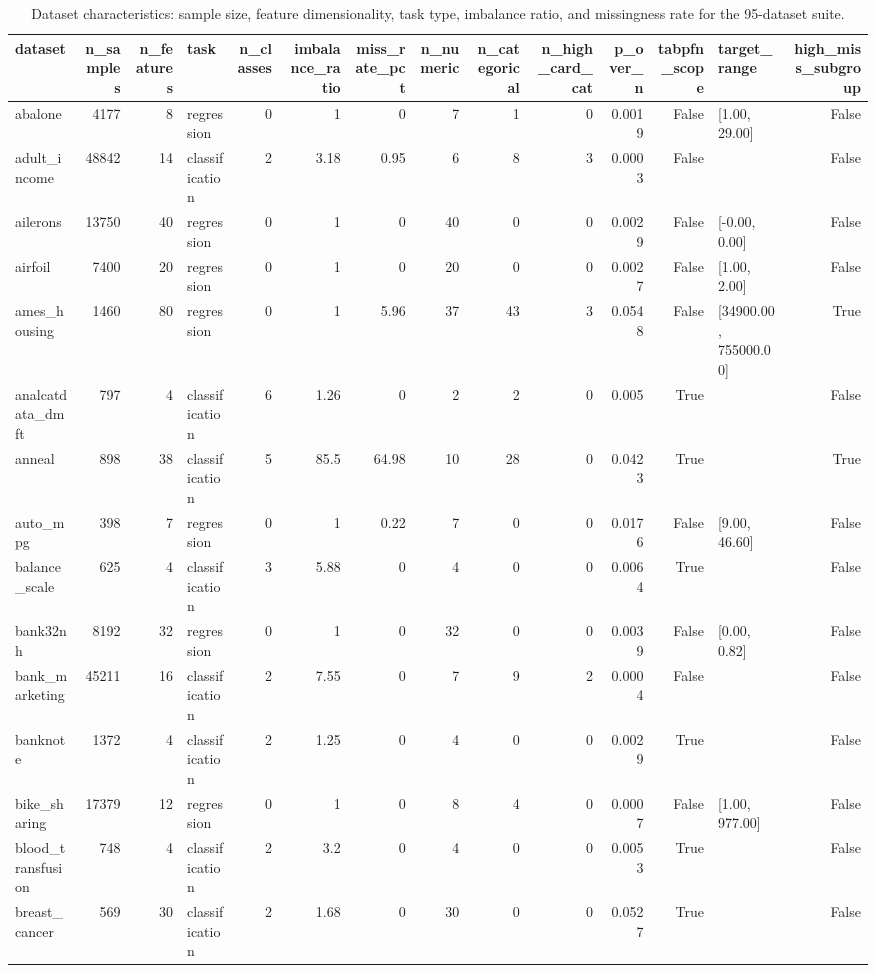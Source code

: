 \begin{table}
\caption{Dataset characteristics: sample size, feature dimensionality, task type, imbalance ratio, and missingness rate for the 95-dataset suite.}
\label{tab:datasets}
\begin{tabular}{lrrlrrrrrrrrlr}
\toprule
dataset & n\_samples & n\_features & task & n\_classes & imbalance\_ratio & miss\_rate\_pct & n\_numeric & n\_categorical & n\_high\_card\_cat & p\_over\_n & tabpfn\_scope & target\_range & high\_miss\_subgroup \\
\midrule
abalone & 4177 & 8 & regression & 0 & 1 & 0 & 7 & 1 & 0 & 0.0019 & False & [1.00, 29.00] & False \\
adult\_income & 48842 & 14 & classification & 2 & 3.18 & 0.95 & 6 & 8 & 3 & 0.0003 & False &  & False \\
ailerons & 13750 & 40 & regression & 0 & 1 & 0 & 40 & 0 & 0 & 0.0029 & False & [-0.00, 0.00] & False \\
airfoil & 7400 & 20 & regression & 0 & 1 & 0 & 20 & 0 & 0 & 0.0027 & False & [1.00, 2.00] & False \\
ames\_housing & 1460 & 80 & regression & 0 & 1 & 5.96 & 37 & 43 & 3 & 0.0548 & False & [34900.00, 755000.00] & True \\
analcatdata\_dmft & 797 & 4 & classification & 6 & 1.26 & 0 & 2 & 2 & 0 & 0.005 & True &  & False \\
anneal & 898 & 38 & classification & 5 & 85.5 & 64.98 & 10 & 28 & 0 & 0.0423 & True &  & True \\
auto\_mpg & 398 & 7 & regression & 0 & 1 & 0.22 & 7 & 0 & 0 & 0.0176 & False & [9.00, 46.60] & False \\
balance\_scale & 625 & 4 & classification & 3 & 5.88 & 0 & 4 & 0 & 0 & 0.0064 & True &  & False \\
bank32nh & 8192 & 32 & regression & 0 & 1 & 0 & 32 & 0 & 0 & 0.0039 & False & [0.00, 0.82] & False \\
bank\_marketing & 45211 & 16 & classification & 2 & 7.55 & 0 & 7 & 9 & 2 & 0.0004 & False &  & False \\
banknote & 1372 & 4 & classification & 2 & 1.25 & 0 & 4 & 0 & 0 & 0.0029 & True &  & False \\
bike\_sharing & 17379 & 12 & regression & 0 & 1 & 0 & 8 & 4 & 0 & 0.0007 & False & [1.00, 977.00] & False \\
blood\_transfusion & 748 & 4 & classification & 2 & 3.2 & 0 & 4 & 0 & 0 & 0.0053 & True &  & False \\
breast\_cancer & 569 & 30 & classification & 2 & 1.68 & 0 & 30 & 0 & 0 & 0.0527 & True &  & False \\

\end{tabular}
\end{table}
